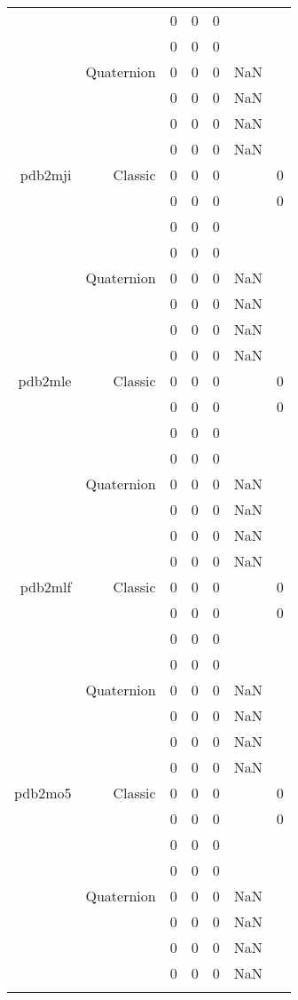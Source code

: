 \begin{xltabular}{\textwidth}{r|rcccSc}
& & 0 & 0 & 0 & & \\
& & 0 & 0 & 0 & & \\
& Quaternion & 0 & 0 & 0 & NaN & \\
& & 0 & 0 & 0 & NaN & \\
& & 0 & 0 & 0 & NaN & \\
& & 0 & 0 & 0 & NaN & \\ \addlinespace
pdb2mji & Classic & 0 & 0 & 0 & & 0 \\
& & 0 & 0 & 0 & & 0 \\
& & 0 & 0 & 0 & & \\
& & 0 & 0 & 0 & & \\
& Quaternion & 0 & 0 & 0 & NaN & \\
& & 0 & 0 & 0 & NaN & \\
& & 0 & 0 & 0 & NaN & \\
& & 0 & 0 & 0 & NaN & \\ \addlinespace
pdb2mle & Classic & 0 & 0 & 0 & & 0 \\
& & 0 & 0 & 0 & & 0 \\
& & 0 & 0 & 0 & & \\
& & 0 & 0 & 0 & & \\
& Quaternion & 0 & 0 & 0 & NaN & \\
& & 0 & 0 & 0 & NaN & \\
& & 0 & 0 & 0 & NaN & \\
& & 0 & 0 & 0 & NaN & \\ \addlinespace
pdb2mlf & Classic & 0 & 0 & 0 & & 0 \\
& & 0 & 0 & 0 & & 0 \\
& & 0 & 0 & 0 & & \\
& & 0 & 0 & 0 & & \\
& Quaternion & 0 & 0 & 0 & NaN & \\
& & 0 & 0 & 0 & NaN & \\
& & 0 & 0 & 0 & NaN & \\
& & 0 & 0 & 0 & NaN & \\ \addlinespace
pdb2mo5 & Classic & 0 & 0 & 0 & & 0 \\
& & 0 & 0 & 0 & & 0 \\
& & 0 & 0 & 0 & & \\
& & 0 & 0 & 0 & & \\
& Quaternion & 0 & 0 & 0 & NaN & \\
& & 0 & 0 & 0 & NaN & \\
& & 0 & 0 & 0 & NaN & \\
& & 0 & 0 & 0 & NaN & \\ \addlinespace

\end{xltabular}
